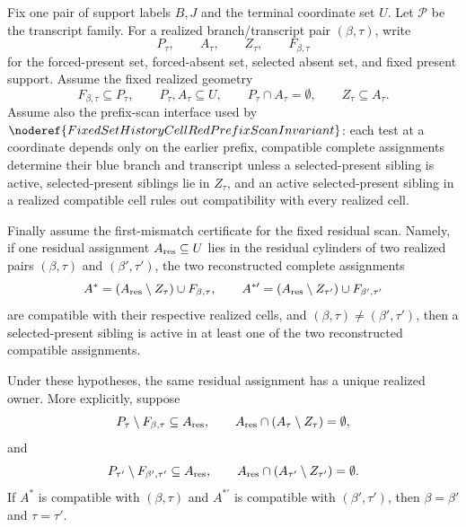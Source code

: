 \begin{helper}
Fix one pair of support labels \(B,J\) and the terminal coordinate set
\(U\).  Let \(\mathcal P\) be the transcript family.  For a realized
branch/transcript pair \((\beta,\tau)\), write
\[
P_\tau,\qquad A_\tau,\qquad Z_\tau,\qquad F_{\beta,\tau}
\]
for the forced-present set, forced-absent set, selected absent set, and
fixed present support.  Assume the fixed realized geometry
\[
F_{\beta,\tau}\subseteq P_\tau,\qquad
P_\tau,A_\tau\subseteq U,\qquad
P_\tau\cap A_\tau=\emptyset,\qquad
Z_\tau\subseteq A_\tau .
\]
Assume also the prefix-scan interface used by
\(\noderef{FixedSetHistoryCellRedPrefixScanInvariant}\): each test at a
coordinate depends only on the earlier prefix, compatible complete
assignments determine their blue branch and transcript unless a
selected-present sibling is active, selected-present siblings lie in
\(Z_\tau\), and an active selected-present sibling in a realized compatible
cell rules out compatibility with every realized cell.

Finally assume the first-mismatch certificate for the fixed residual
scan.  Namely, if one residual assignment \(A_{\rm res}\subseteq U\) lies
in the residual cylinders of two realized pairs \((\beta,\tau)\) and
\((\beta',\tau')\), the two reconstructed complete assignments
\[
A^\ast=(A_{\rm res}\setminus Z_\tau)\cup F_{\beta,\tau},
\qquad
A^{\ast\prime}=(A_{\rm res}\setminus Z_{\tau'})
  \cup F_{\beta',\tau'}
\]
are compatible with their respective realized cells, and
\((\beta,\tau)\ne(\beta',\tau')\), then a selected-present sibling is
active in at least one of the two reconstructed compatible assignments.

Under these hypotheses, the same residual assignment has a unique realized
owner.  More explicitly, suppose
\[
P_\tau\setminus F_{\beta,\tau}\subseteq A_{\rm res},\qquad
A_{\rm res}\cap(A_\tau\setminus Z_\tau)=\emptyset ,
\]
and
\[
P_{\tau'}\setminus F_{\beta',\tau'}\subseteq A_{\rm res},\qquad
A_{\rm res}\cap(A_{\tau'}\setminus Z_{\tau'})=\emptyset .
\]
If \(A^\ast\) is compatible with \((\beta,\tau)\) and
\(A^{\ast\prime}\) is compatible with \((\beta',\tau')\), then
\(\beta=\beta'\) and \(\tau=\tau'\).
\end{helper}

